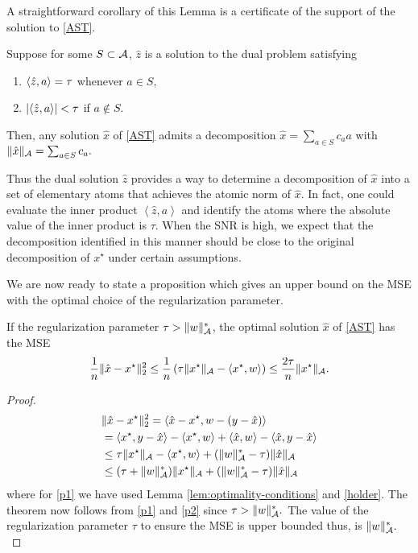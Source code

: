 A straightforward corollary of this Lemma is a certificate of the support of the
solution to \eqref{AST}.

\begin{corollary}
\label{cor:dual-cert-support}

Suppose for some $S \subset \mathcal{A}$,  $\hat{z}$ is a solution to the dual problem  satisfying
\begin{enumerate}
\item $\langle\hat{z}, a\rangle = \tau$ whenever $a \in S,$
\item $|\langle\hat{z}, a\rangle| < \tau$ if $a \not\in S.$
\end{enumerate}
Then, any solution $\hat{x}$ of \eqref{AST} admits a decomposition $\hat{x} =
\sum_{a \in S}{c_a a}$ with $\lVert\hat{x}\rVert_{\mathcal{A}} = \sum_{a \in S}{c_a}.$

\end{corollary}

Thus the dual solution $\hat{z}$ provides a way to determine a
decomposition of $\hat{x}$ into a set of elementary atoms that achieves the
atomic norm of $\hat{x}$. In fact, one could evaluate the inner product
$\left<\hat{z}, a\right>$ and identify the atoms where the absolute value of the
inner product is $\tau$. When the SNR is high, we expect that the
decomposition identified in this manner should be close to the original
decomposition of $x^\star$ under certain assumptions.


We are now ready to state a proposition which gives an upper bound on the MSE
with the optimal choice of the regularization parameter.

\begin{prop}
\label{prop:main-result}

If the regularization parameter $\tau > \lVert w\rVert_{\mathcal{A}}^*$, the optimal solution
$\hat{x}$ of \eqref{AST} has the MSE
\begin{equation}\label{eq:slow-mse}
\frac{1}{n}\lVert\hat{x} - x^\star\rVert_2^2 \leq \frac{1}{n}\left(\tau \lVert x^\star\rVert_{\mathcal{A}} - \langle x^\star, w\rangle\right) \leq \frac{2\tau}{n}\lVert x^\star\rVert_{\mathcal{A}}.
\end{equation} 
\begin{proof}
\begin{align}
	&\lVert\hat{x} - x^\star\rVert_2^2 = \langle\hat{x}-x^\star, w-(y -\hat{x})\rangle         \label{expand}\\
	& = \langle x^\star, y-\hat{x}\rangle - \langle x^\star, w\rangle +\langle\hat{x}, w\rangle -\langle\hat{x}, y-\hat{x}\rangle\nonumber\\
	& \leq \tau\lVert x^\star\rVert_{\mathcal{A}} - \langle x^\star, w\rangle+ (\lVert w\rVert_{\mathcal{A}}^* -  \tau)\lVert\hat{x}\rVert_{\mathcal{A}}\label{p1}\\
	& \leq (\tau + \lVert w\rVert_{\mathcal{A}}^*)\lVert x^\star\rVert_{\mathcal{A}} + (\lVert w\rVert_{\mathcal{A}}^* - \tau)\lVert\hat{x}\rVert_{\mathcal{A}}\label{p2}
\end{align}
where for  \eqref{p1} we have used Lemma \ref{lem:optimality-conditions} and \eqref{holder}. 
The theorem now follows from \eqref{p1} and \eqref{p2} since $\tau
> \lVert w\rVert_{\mathcal{A}}^*.$ The value of the regularization parameter $\tau$ to ensure
the MSE is upper bounded thus, is $\lVert w\rVert_{\mathcal{A}}^*.$
\end{proof}
\end{prop}

